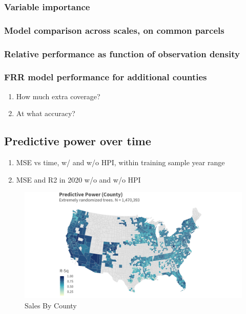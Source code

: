 \documentclass[12pt]{article}
\begin{document}
 \subsubsection{Variable importance}
 \subsubsection{Model comparison across scales, on common parcels}
 \subsubsection{Relative performance as function of observation density}
 \subsubsection{FRR model performance for additional counties}
 
 \begin{enumerate}
    \item How much extra coverage?
    \item At what accuracy?
 \end{enumerate}
 
  
\subsection{Predictive power over time}

\begin{enumerate}
    \item MSE vs time, w/ and w/o HPI, within training sample year range
    \item MSE and R2 in 2020 w/o and w/o HPI 
\end{enumerate}

 
 
\begin{figure}
    \centering
    \includegraphics[width=6in]{figures/rf_rsq_map.png}
    \caption{Sales By County}
    \label{fig:rsq_county}
\end{figure}
\end{document}
